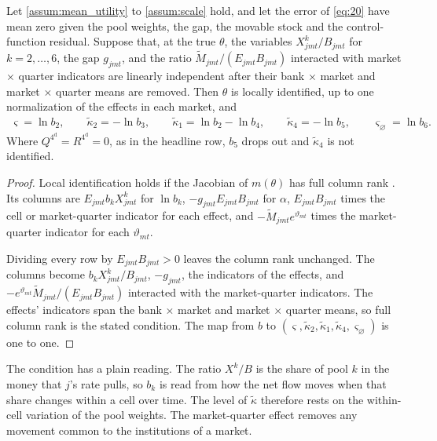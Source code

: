 \begin{prop}\label{prop:app_ident}
	Let \ref{assum:mean_utility} to \ref{assum:scale} hold, and let the error of \eqref{eq:20} have mean zero given the pool weights, the gap, the movable stock and the control-function residual. Suppose that, at the true $\theta$, the variables $X^{k}_{jmt}/B_{jmt}$ for $k=2,\dots,6$, the gap $g_{jmt}$, and the ratio $\tilde{M}_{jmt}/(E_{jmt}B_{jmt})$ interacted with market $\times$ quarter indicators are linearly independent after their bank $\times$ market and market $\times$ quarter means are removed. Then $\theta$ is locally identified, up to one normalization of the effects in each market, and
	\begin{gather*}
		\varsigma=\ln b_2,\qquad \tilde{\kappa}_2=-\ln b_3,\qquad \tilde{\kappa}_1=\ln b_2-\ln b_4,\qquad \tilde{\kappa}_4=-\ln b_5,\qquad \varsigma_{\varnothing}=\ln b_6.
	\end{gather*}
	Where $Q^{4^{\mathrm{d}}}=R^{4^{\mathrm{d}}}=0$, as in the headline row, $b_5$ drops out and $\tilde{\kappa}_4$ is not identified.
\end{prop}

\begin{proof}
	Local identification holds if the Jacobian of $m(\theta)$ has full column rank \parencite{rothenberg1971identification}. Its columns are $E_{jmt}b_kX^{k}_{jmt}$ for $\ln b_k$, $-g_{jmt}E_{jmt}B_{jmt}$ for $\alpha$, $E_{jmt}B_{jmt}$ times the cell or market-quarter indicator for each effect, and $-\tilde{M}_{jmt}e^{\vartheta_{mt}}$ times the market-quarter indicator for each $\vartheta_{mt}$.

	Dividing every row by $E_{jmt}B_{jmt}>0$ leaves the column rank unchanged. The columns become $b_kX^{k}_{jmt}/B_{jmt}$, $-g_{jmt}$, the indicators of the effects, and $-e^{\vartheta_{mt}}\tilde{M}_{jmt}/(E_{jmt}B_{jmt})$ interacted with the market-quarter indicators. The effects' indicators span the bank $\times$ market and market $\times$ quarter means, so full column rank is the stated condition. The map from $b$ to $(\varsigma,\tilde{\kappa}_2,\tilde{\kappa}_1,\tilde{\kappa}_4,\varsigma_{\varnothing})$ is one to one.
\end{proof}

The condition has a plain reading. The ratio $X^{k}/B$ is the share of pool $k$ in the money that $j$'s rate pulls, so $b_k$ is read from how the net flow moves when that share changes within a cell over time. The level of $\tilde{\kappa}$ therefore rests on the within-cell variation of the pool weights. The market-quarter effect removes any movement common to the institutions of a market.


